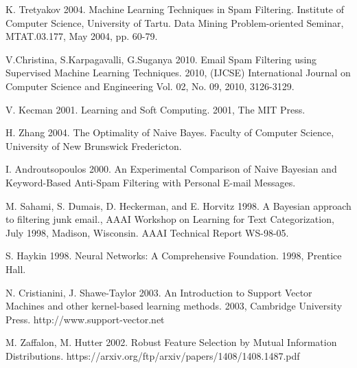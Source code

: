 \documentclass[12pt]{report}
\begin{document}
\begin{thebibliography}{30}

 K. Tretyakov 2004. Machine Learning Techniques in Spam Filtering. Institute of Computer Science, University of Tartu. Data Mining Problem-oriented Seminar, MTAT.03.177, May 2004, pp. 60-79.

 V.Christina, S.Karpagavalli, G.Suganya 2010. Email Spam Filtering using Supervised Machine Learning Techniques. 2010, (IJCSE) International Journal on Computer Science and Engineering Vol. 02, No. 09, 2010, 3126-3129.

 V. Kecman 2001. Learning and Soft Computing. 2001, The MIT Press.

 H. Zhang 2004. The Optimality of Naive Bayes. Faculty of Computer Science, University of New Brunswick Fredericton.

 I. Androutsopoulos 2000. An Experimental Comparison of Naive Bayesian and Keyword-Based Anti-Spam Filtering with Personal E-mail Messages.

 M. Sahami, S. Dumais, D. Heckerman, and E. Horvitz 1998. A Bayesian approach to filtering junk email., AAAI Workshop on Learning for Text Categorization, July 1998, Madison, Wisconsin. AAAI Technical Report WS-98-05.

 S. Haykin 1998. Neural Networks: A Comprehensive Foundation. 1998, Prentice
Hall.

 N. Cristianini, J. Shawe-Taylor 2003. An Introduction to Support Vector Machines and other kernel-based learning methods. 2003, Cambridge University Press. http://www.support-vector.net

 M. Zaffalon, M. Hutter 2002. Robust Feature Selection by Mutual Information Distributions. https://arxiv.org/ftp/arxiv/papers/1408/1408.1487.pdf

\end{thebibliography}
\end{document}
